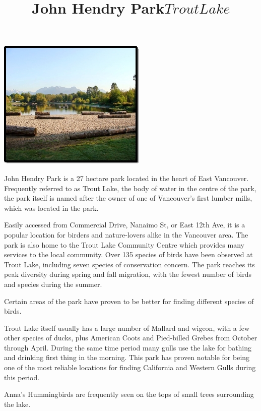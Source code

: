 \title{John Hendry Park}
\title{\(Trout Lake\)}

\includegraphics{tlcover.jpg}

John Hendry Park is a 27 hectare park located in the heart of East Vancouver. Frequently referred to as Trout Lake, the body of water in the centre of the park, the park itself is named after the owner of one of Vancouver’s first lumber mills, which was located in the park. 

Easily accessed from Commercial Drive, Nanaimo St, or East 12th Ave, it is a popular location for birders and nature-lovers alike in the Vancouver area. The park is also home to the Trout Lake Community Centre which provides many services to the local community. Over 135 species of birds have been observed at Trout Lake, including seven species of conservation concern. The park reaches its peak diversity during spring and fall migration, with the fewest number of birds and species during the summer. 

Certain areas of the park have proven to be better for finding different species of birds. 

Trout Lake itself usually has a large number of Mallard and wigeon, with a few other species of ducks, plus American Coots and Pied-billed Grebes from October through April. During the same time period many gulls use the lake for bathing and drinking first thing in the morning. This park has proven notable for being one of the most reliable locations for finding California and Western Gulls during this period. 

Anna’s Hummingbirds are frequently seen on the tops of small trees surrounding the lake.
